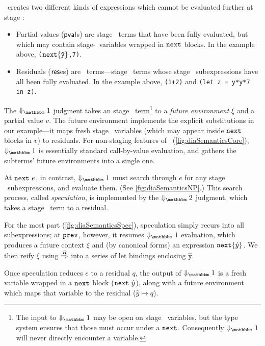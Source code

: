 \lang\ creates two different kinds of expressions which
cannot be evaluated further at stage \bbone:
\begin{itemize}
\item Partial values ($\mathsf{pval}$s) are stage \bbone\ terms that have been fully
evaluated, but which may contain stage-\bbtwo\ variables wrapped in ${\tt next}$
blocks.  In the example above, 
\verb|(|${\tt next} \{\mathtt{\hat y}\}$\verb|,7)|.

\item Residuals ($\mathsf{res}$es) are \langTwo\ terms---stage \bbtwo\ terms whose
stage \bbone\ subexpressions have all been fully evaluated. In the example
above,
\verb|(1+2)| and \verb|(let z = y*y*7 in z)|.

\end{itemize}


The $\redonesym$ judgment takes an stage \bbone\ term\footnote{
The input to $\redonesym$ may be open on stage \bbtwo\ variables,
but the type system ensures that those must occur under a ${\tt next}$.
Consequently $\redonesym$ will never directly encounter a variable.
} to a {\em future environment} $\xi$ and a partial value $v$.  
The future environment implements
the explicit substitutions in our example---it maps fresh stage \bbtwo\
variables (which may appear inside ${\tt next}$ blocks in $v$) to
residuals. For non-staging features of \lang\ (\ref{fig:diaSemanticsCore}),
$\redonesym$ is essentially standard call-by-value evaluation, and gathers the
subterms' future environments into a single one.

At ${\tt next}~e$, in contrast, $\redonesym$ must search through $e$ for any stage
\bbone\ subexpressions, and evaluate them.  (See \ref{fig:diaSemanticsNP}.)
This search process, called \emph{speculation}, is implemented by the
$\redtwosym$ judgment, which takes a stage \bbtwo\ term to a residual. 

For the most part (\ref{fig:diaSemanticsSpec}), speculation simply recurs into
all subexpressions; at ${\tt prev}$, however, it resumes $\redonesym$ evaluation,
which produces a future context $\xi$ and (by canonical forms) an expression
${\tt next}\{\hat y\}$. We then reify $\xi$ using $\overset{R}\Rightarrow$ into a series of let
bindings enclosing $\mathtt{\hat y}$.

Once speculation reduces $e$ to a residual $q$, the output of $\redonesym$ is a
fresh variable wrapped in a ${\tt next}$ block (${\tt next}~\hat y$), along with a future
environment which maps that variable to the residual ($\hat y \mapsto q$).

